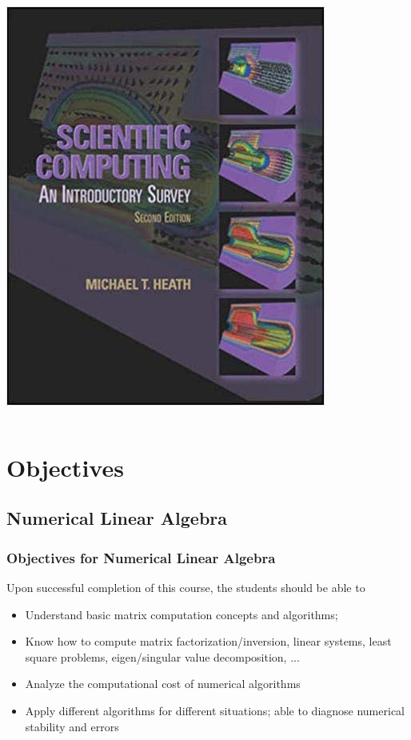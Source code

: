 \documentclass[10pt]{beamer}
\begin{document}
\begin{frame}
\begin{columns}
\begin{itemize}
            \includegraphics[height=0.5\textheight]{scientific-computing.jpg}
    \end{itemize}
  \end{columns}
\end{frame}

\section{Objectives}
\subsection{Numerical Linear Algebra}
\begin{frame}
  \frametitle{Objectives for Numerical Linear Algebra}
  Upon successful completion of this course, the students should be able to
  \begin{itemize}
    \item <2-> Understand basic matrix computation concepts and algorithms;
    \item <3-> Know how to compute matrix factorization/inversion, linear systems, least square problems, eigen/singular value decomposition, ...
    \item <4-> Analyze the computational cost of numerical algorithms
    \item <5-> Apply different algorithms for different situations; able to diagnose numerical stability and errors
  \end{itemize}
\end{frame}
\end{document}
